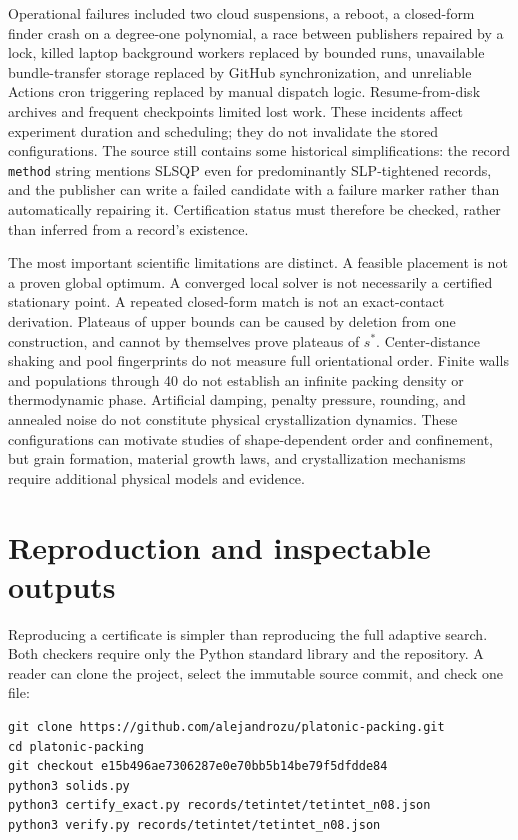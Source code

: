 \documentclass[11pt,a4paper]{article}
\begin{document}
Operational failures included two cloud suspensions, a reboot, a closed-form finder crash on a degree-one polynomial, a race between publishers repaired by a lock, killed laptop background workers replaced by bounded runs, unavailable bundle-transfer storage replaced by GitHub synchronization, and unreliable Actions cron triggering replaced by manual dispatch logic. Resume-from-disk archives and frequent checkpoints limited lost work. These incidents affect experiment duration and scheduling; they do not invalidate the stored configurations. The source still contains some historical simplifications: the record \nolinkurl{method} string mentions SLSQP even for predominantly SLP-tightened records, and the publisher can write a failed candidate with a failure marker rather than automatically repairing it. Certification status must therefore be checked, rather than inferred from a record's existence.

The most important scientific limitations are distinct. A feasible placement is not a proven global optimum. A converged local solver is not necessarily a certified stationary point. A repeated closed-form match is not an exact-contact derivation. Plateaus of upper bounds can be caused by deletion from one construction, and cannot by themselves prove plateaus of \(s^*\). Center-distance shaking and pool fingerprints do not measure full orientational order. Finite walls and populations through 40 do not establish an infinite packing density or thermodynamic phase. Artificial damping, penalty pressure, rounding, and annealed noise do not constitute physical crystallization dynamics. These configurations can motivate studies of shape-dependent order and confinement, but grain formation, material growth laws, and crystallization mechanisms require additional physical models and evidence.

\section{Reproduction and inspectable outputs}

Reproducing a certificate is simpler than reproducing the full adaptive search. Both checkers require only the Python standard library and the repository. A reader can clone the project, select the immutable source commit, and check one file:

\begin{Verbatim}[fontsize=\footnotesize,breaklines=true]
git clone https://github.com/alejandrozu/platonic-packing.git
cd platonic-packing
git checkout e15b496ae7306287e0e70bb5b14be79f5dfdde84
python3 solids.py
python3 certify_exact.py records/tetintet/tetintet_n08.json
python3 verify.py records/tetintet/tetintet_n08.json
\end{Verbatim}
\end{document}
